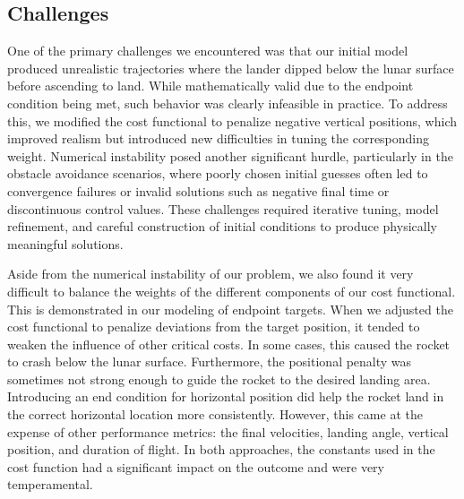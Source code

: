 \documentclass{article}
\begin{document}
\subsection{Challenges}
One of the primary challenges we encountered was that our initial model produced unrealistic trajectories where the lander dipped below the lunar surface before ascending to land. While mathematically valid due to the endpoint condition being met, such behavior was clearly infeasible in practice. To address this, we modified the cost functional to penalize negative vertical positions, which improved realism but introduced new difficulties in tuning the corresponding weight. 
Numerical instability posed another significant hurdle, particularly in the obstacle avoidance scenarios, where poorly chosen initial guesses often led to convergence failures or invalid solutions such as negative final time or discontinuous control values. These challenges required iterative tuning, model refinement, and careful construction of initial conditions to produce physically meaningful solutions.

Aside from the numerical instability of our problem, we also found it very difficult to balance the weights of the different components of our cost functional. This is demonstrated in our modeling of endpoint targets. When we adjusted the cost functional to penalize deviations from the target position, it tended to weaken the influence of other critical costs. In some cases, this caused the rocket to crash below the lunar surface. Furthermore, the positional penalty was sometimes not strong enough to guide the rocket to the desired landing area. Introducing an end condition for horizontal position did help the rocket land in the correct horizontal location more consistently. However, this came at the expense of other performance metrics: the final velocities, landing angle, vertical position, and duration of flight. In both approaches, the constants used in the cost function had a significant impact on the outcome and were very temperamental. 
\end{document}

